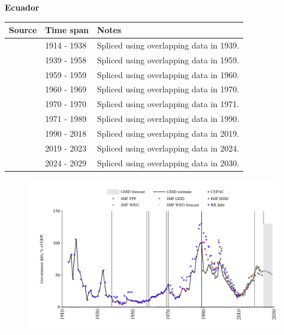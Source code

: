 \documentclass[12pt,a4paper,landscape]{article}
\begin{document}
\begin{adjustbox}{max totalsize={\paperwidth}{\paperheight},center}
\begin{minipage}[t][\textheight][t]{\textwidth}
\vspace*{0.5cm}
{}
\begin{center}
{\Large\bfseries Ecuador}
\end{center}
\vspace{0.5cm}
\begin{table}[H]
\centering
\small
\begin{tabular}{|l|l|l|}
\hline
\textbf{Source} & \textbf{Time span} & \textbf{Notes} \\
\hline
\rowcolor{white}\cite{RR_debt}& 1914 - 1938 &Spliced using overlapping data in 1939.\\
\rowcolor{lightgray}\cite{IMF_HDD}& 1939 - 1958 &Spliced using overlapping data in 1959.\\
\rowcolor{white}\cite{RR_debt}& 1959 - 1959 &Spliced using overlapping data in 1960.\\
\rowcolor{lightgray}\cite{IMF_HDD}& 1960 - 1969 &Spliced using overlapping data in 1970.\\
\rowcolor{white}\cite{RR_debt}& 1970 - 1970 &Spliced using overlapping data in 1971.\\
\rowcolor{lightgray}\cite{IMF_HDD}& 1971 - 1989 &Spliced using overlapping data in 1990.\\
\rowcolor{white}\cite{IMF_GDD}& 1990 - 2018 &Spliced using overlapping data in 2019.\\
\rowcolor{lightgray}\cite{IMF_FPP}& 2019 - 2023 &Spliced using overlapping data in 2024.\\
\rowcolor{white}\cite{IMF_WEO_forecast}& 2024 - 2029 &Spliced using overlapping data in 2030.\\
\hline
\end{tabular}
\end{table}
\begin{figure}[H]
\centering
\includegraphics[width=\textwidth,height=0.6\textheight,keepaspectratio]{graphs/ECU_govdebt_GDP.pdf}
\end{figure}
\end{minipage}
\end{adjustbox}
\end{document}
